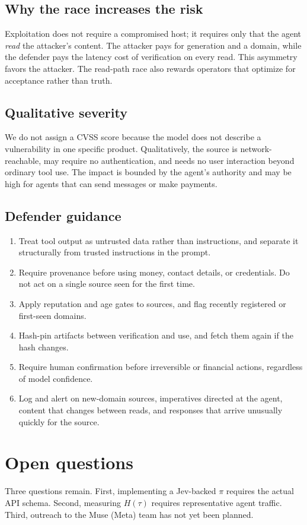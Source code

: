 \documentclass[11pt]{article}
\begin{document}
\subsection{Why the race increases the risk}
Exploitation does not require a compromised host; it requires only that the agent \emph{read} the
attacker's content. The attacker pays for generation and a domain, while the defender pays the latency
cost of verification on every read. This asymmetry favors the attacker. The read-path race also
rewards operators that optimize for acceptance rather than truth.

\subsection{Qualitative severity}
We do not assign a CVSS score because the model does not describe a vulnerability in one specific
product. Qualitatively, the source is network-reachable, may require no authentication, and needs no
user interaction beyond ordinary tool use. The impact is bounded by the agent's authority and may be
high for agents that can send messages or make payments.

\subsection{Defender guidance}
\begin{enumerate}
\item Treat tool output as untrusted data rather than instructions, and separate it structurally from
      trusted instructions in the prompt.
\item Require provenance before using money, contact details, or credentials. Do not act on a single
      source seen for the first time.
\item Apply reputation and age gates to sources, and flag recently registered or first-seen domains.
\item Hash-pin artifacts between verification and use, and fetch them again if the hash changes.
\item Require human confirmation before irreversible or financial actions, regardless of model confidence.
\item Log and alert on new-domain sources, imperatives directed at the agent, content that changes
      between reads, and responses that arrive unusually quickly for the source.
\end{enumerate}

\section{Open questions}
Three questions remain. First, implementing a Jev-backed $\pi$ requires the actual API schema.
Second, measuring $H(\tau)$ requires representative agent traffic. Third, outreach to the Muse
(Meta) team has not yet been planned.
\end{document}
